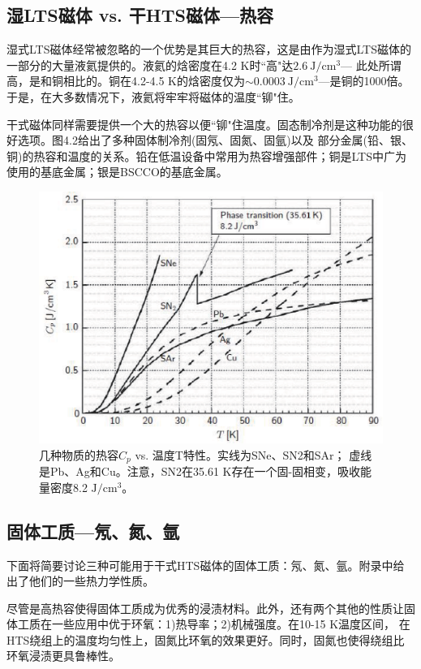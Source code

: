 \subsection{湿LTS磁体 vs. 干HTS磁体---热容}
湿式LTS磁体经常被忽略的一个优势是其巨大的热容，这是由作为湿式LTS磁体的一部分的大量液氦提供的。液氦的焓密度在4.2 K时``高"达$2.6\ \mathrm{ J/cm^3}$---
此处所谓高，是和铜相比的。铜在4.2-4.5 K的焓密度仅为$\sim 0.0003\ \mathrm{ J/cm^3}$---是铜的1000倍。于是，在大多数情况下，液氦将牢牢将磁体的温度``铆"住。

干式磁体同样需要提供一个大的热容以便``铆"住温度。固态制冷剂是这种功能的很好选项。图4.2给出了多种固体制冷剂(固氖、固氮、固氩)以及
部分金属(铅、银、铜)的热容和温度的关系。铅在低温设备中常用为热容增强部件；铜是LTS中广为使用的基底金属；银是BSCCO的基底金属。
\begin{figure}
  \centering
 \includegraphics[scale=0.7]{chpt4/figs/fig4.2.eps}
  \caption{几种物质的热容$C_p$ vs. 温度T特性。实线为SNe、SN2和SAr；
  虚线是Pb、Ag和Cu。注意，SN2在35.61 K存在一个固-固相变，吸收能量密度8.2 $\mathrm{J/cm^3}$。}
\end{figure}

\subsection{固体工质---氖、氮、氩}
下面将简要讨论三种可能用于干式HTS磁体的固体工质：氖、氮、氩。附录中给出了他们的一些热力学性质。

尽管是高热容使得固体工质成为优秀的浸渍材料。此外，还有两个其他的性质让固体工质在一些应用中优于环氧：1)热导率；2)机械强度。在10-15 K温度区间，
在HTS绕组上的温度均匀性上，固氮比环氧的效果更好。同时，固氮也使得绕组比环氧浸渍更具鲁棒性。

